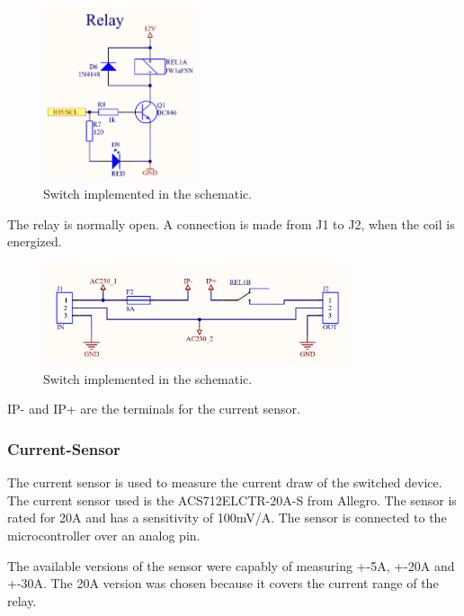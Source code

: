         \begin{figure}[H]
            \centering
            \includegraphics[width=0.4\textwidth]{assets/HW/Relay-Coil-schematic.png}
            \caption{Switch implemented in the schematic.}
        \end{figure}

        The relay is normally open. A connection is made from J1 to J2, when the coil is energized.

        \begin{figure}[H]
            \centering
            \includegraphics[width=0.8\textwidth]{assets/HW/Relay-Contact-schematic.png}
            \caption{Switch implemented in the schematic.}
        \end{figure}

        IP- and IP+ are the terminals for the current sensor.

    \subsubsection{Current-Sensor}

        The current sensor is used to measure the current draw of the switched device. The current
        sensor used is the ACS712ELCTR-20A-S from Allegro. The sensor is rated for 20A and has a 
        sensitivity of 100mV/A. The sensor is connected to the microcontroller over an analog pin.

        The available versions of the sensor were capably of measuring +-5A, +-20A and +-30A. 
        The 20A version was chosen because it covers the current range of the relay. 

